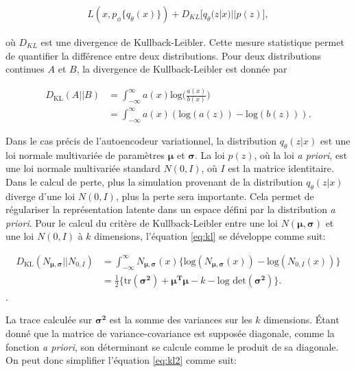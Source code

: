 \begin{gather}  \label{eq:loss_vae}
L(x, p_\phi\{q_\theta(x)\}) + D_{KL}\big[q_\theta(z|x) || p(z)\big],
\end{gather}


où $D_{KL}$ est une divergence de Kullback-Leibler. Cette mesure statistique permet de quantifier la différence entre deux distributions. Pour deux distributions continues $A$ et $B$, la divergence de Kullback-Leibler est donnée par

\begin{equation}  \label{eq:kl}
	\begin{aligned}
		D_{\text{KL}}(A || B) &= \int_{-\infty}^{\infty} a(x) \text{log} \Big(\frac{a(x)}{b(x)}\Big)  \\
		 &= \int_{-\infty}^{\infty} a(x) (\text{log}(a(z)) - \text{log}(b(z))).
	\end{aligned}
\end{equation}

Dans le cas précis de l'autoencodeur variationnel, la distribution $q_{\theta}(z|x)$ est une loi normale multivariée de paramètres $\boldsymbol \mu$ et $\boldsymbol \sigma$. La loi $p(z)$, où la loi \textit{a priori}, est une loi normale multivariée standard $N(0,I)$, où $I$ est la matrice identitaire. Dans le calcul de perte, plus la simulation provenant de la distribution $q_{\theta}(z|x)$ diverge d'une loi $N(0, I)$, plus la perte sera importante. Cela permet de régulariser la représentation latente dans un espace défini par la distribution \textit{a priori}. Pour le calcul du critère de Kullback-Leibler entre une loi $N(\boldsymbol \mu, \boldsymbol \sigma)$ et une loi $N(0, I)$ à $k$ dimensions, l'équation \ref{eq:kl} se développe comme suit:

\begin{equation}  \label{eq:kl2}
	\begin{aligned}
	D_{\text{KL}}(N_{\boldsymbol \mu, \boldsymbol \sigma} || N_{0,I}) &= \int_{-\infty}^{\infty} N_{\boldsymbol \mu, \boldsymbol \sigma}(x) \big\{\text{log}(N_{\boldsymbol \mu,\boldsymbol \sigma}(x)) - \text{log}(N_{0,I}(x))\big\} \\
		&= \frac{1}{2}\big\{\text{tr}(\boldsymbol{\sigma^2}) + \boldsymbol{\mu^T} \boldsymbol{\mu} - k - \text{log det}(\boldsymbol{\sigma^2})\big \}.
 	\end{aligned}
\end{equation}.

La trace calculée sur $\boldsymbol{\sigma^2}$ est la somme des variances sur les $k$ dimensions. Étant donné que la matrice de variance-covariance est supposée diagonale, comme la fonction \textit{a priori}, son déterminant se calcule comme le produit de sa diagonale. On peut donc simplifier l'équation \ref{eq:kl2} comme suit:

